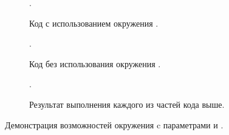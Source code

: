 \begin{figure}[htp!]
    \centering
    \begin{subfigure}{\textwidth}
        \begin{Latexcode}
            \begin{rslingu}
                  
                 .
            \end{rslingu}
        \end{Latexcode}
        \caption{Код с использованием окружения .}
    \end{subfigure}\vspace*{.75cm}
    \begin{subfigure}{\textwidth}
        \begin{Latexcode}
             
             
            .
        \end{Latexcode}
        \caption{Код без использования окружения .}
    \end{subfigure}\vspace*{.75cm}
    \begin{subfigure}{.9\textwidth}
        \centering
        \begin{rslingu}
              
             .
        \end{rslingu}
        \caption{Результат выполнения каждого из частей кода выше.}
    \end{subfigure}
    \caption{Демонстрация возможностей окружения  c параметрами  и .}
\end{figure}



\clearpage

